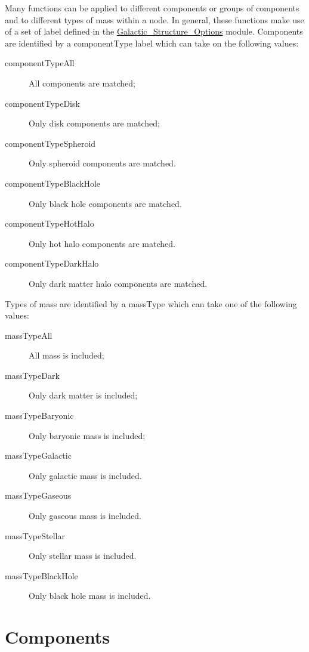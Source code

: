 Many functions can be applied to different components or groups of components and to different types of mass within a node. In general, these functions make use of a set of label defined in the \hyperlink{galactic_structure.options.F90:galactic_structure_options}{{\normalfont \ttfamily Galactic\_Structure\_Options}} module. Components are identified by a {\normalfont \ttfamily componentType} label which can take on the following values:
\begin{description}
 \item [{\normalfont \ttfamily componentTypeAll}] All components are matched;
 \item [{\normalfont \ttfamily componentTypeDisk}] Only disk components are matched;
 \item [{\normalfont \ttfamily componentTypeSpheroid}] Only spheroid components are matched.
 \item [{\normalfont \ttfamily componentTypeBlackHole}] Only black hole components are matched.
 \item [{\normalfont \ttfamily componentTypeHotHalo}] Only hot halo components are matched.
 \item [{\normalfont \ttfamily componentTypeDarkHalo}] Only dark matter halo components are matched.
\end{description}
Types of mass are identified by a {\normalfont \ttfamily massType} which can take one of the following values:
\begin{description}
 \item [{\normalfont \ttfamily massTypeAll}] All mass is included;
 \item [{\normalfont \ttfamily massTypeDark}] Only dark matter is included;
 \item [{\normalfont \ttfamily massTypeBaryonic}] Only baryonic mass is included;
 \item [{\normalfont \ttfamily massTypeGalactic}] Only galactic mass is included.
 \item [{\normalfont \ttfamily massTypeGaseous}] Only gaseous mass is included.
 \item [{\normalfont \ttfamily massTypeStellar}] Only stellar mass is included.
 \item [{\normalfont \ttfamily massTypeBlackHole}] Only black hole mass is included.
\end{description}

\section{Components}

